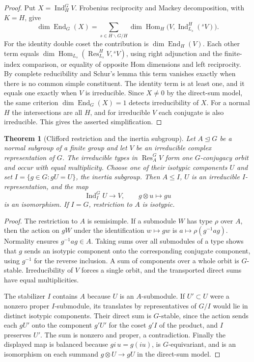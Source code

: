 \documentclass[11pt,oneside,openany]{book}
\newtheorem{theorem}{Theorem}[chapter]
\theoremstyle{definition}
\theoremstyle{remark}
\begin{document}
\begin{proof}
Put \(X=\operatorname{Ind}_H^G V\). Frobenius reciprocity and
Mackey decomposition, with \(K=H\), give
\[
 \dim\operatorname{End}_G(X)=
 \sum_{s\in H\backslash G/H}
   \dim\operatorname{Hom}_H
       \bigl(V,\operatorname{Ind}_{L_s}^H({}^s V)\bigr).
\]
For the identity double coset the contribution is
\(\dim\operatorname{End}_H(V)\). Each other term equals
\(\dim\operatorname{Hom}_{L_s}
    (\operatorname{Res}_{L_s}^H V,{}^s V)\), using right
adjunction and the finite-index comparison, or equality
of opposite Hom dimensions and left reciprocity.
By complete reducibility and Schur's lemma this term vanishes
exactly when there is no common simple constituent.
The identity term is at least one, and it equals one exactly
when \(V\) is irreducible. Since \(X\ne0\) by the direct-sum model,
the same criterion \(\dim\operatorname{End}_G(X)=1\) detects
irreducibility of \(X\). For a normal \(H\) the intersections
are all \(H\), and for irreducible \(V\) each conjugate is also
irreducible. This gives the asserted simplification.
\end{proof}

\begin{theorem}[Clifford restriction and the inertia subgroup]
\label{p103:ALG-07-C03-S04}
Let \(A\trianglelefteq G\) be a normal subgroup of a finite group
and let \(V\) be an irreducible complex representation of \(G\).
The irreducible types in \(\operatorname{Res}_A^G V\) form one
\(G\)-conjugacy orbit and occur with equal multiplicity.
Choose one of their isotypic components \(U\) and set
\(I=\{g\in G:gU=U\}\), the inertia subgroup. Then \(A\le I\),
\(U\) is an irreducible \(I\)-representation, and the map
\[
 \operatorname{Ind}_I^G U\longrightarrow V,\qquad
 g\otimes u\longmapsto gu
\]
is an isomorphism. If \(I=G\), restriction to \(A\) is isotypic.
\end{theorem}

\begin{proof}
The restriction to \(A\) is semisimple. If a submodule \(W\)
has type \(\rho\) over \(A\), then the action on \(gW\) under
the identification \(w\mapsto gw\) is \(a\mapsto\rho(g^{-1}ag)\).
Normality ensures \(g^{-1}ag\in A\). Taking sums over all
submodules of a type shows that \(g\) sends an isotypic component
onto the corresponding conjugate component, using \(g^{-1}\)
for the reverse inclusion. A sum of components over a whole
orbit is \(G\)-stable. Irreducibility of \(V\) forces a single
orbit, and the transported direct sums have equal multiplicities.

The stabilizer \(I\) contains \(A\) because \(U\) is an \(A\)-submodule.
If \(U'\subset U\) were a nonzero proper \(I\)-submodule, its
translates by representatives of \(G/I\) would lie in distinct
isotypic components. Their direct sum is \(G\)-stable, since
the action sends each \(gU'\) onto the component \(g'U'\) for
the coset \(g'I\) of the product, and \(I\) preserves \(U'\).
The sum is nonzero and proper, a contradiction. Finally the
displayed map is balanced because \(gi\,u=g(iu)\), is
\(G\)-equivariant, and is an isomorphism on each summand
\(g\otimes U\to gU\) in the direct-sum model.
\end{proof}
\end{document}
